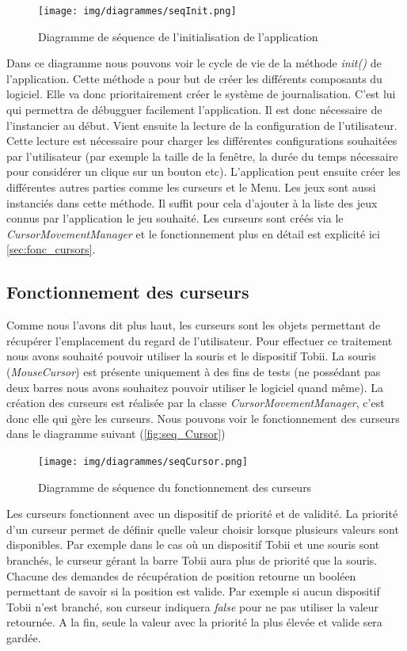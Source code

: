 \documentclass{polytech/polytech}
\begin{document}
\begin{figure}
    \centering
    \texttt{[image: img/diagrammes/seqInit.png]}
    \caption{Diagramme de séquence de l'initialisation de l'application}
    \label{fig:seq_init}
\end{figure}

Dans ce diagramme nous pouvons voir le cycle de vie de la méthode \textit{init()} de l'application. Cette méthode a pour but de créer les différents composants du logiciel. Elle va donc prioritairement créer le système de journalisation. C'est lui qui permettra de débugguer facilement l'application. Il est donc nécessaire de l'instancier au début. Vient ensuite la lecture de la configuration de l'utilisateur. Cette lecture est nécessaire pour charger les différentes configurations souhaitées par l'utilisateur (par exemple la taille de la fenêtre, la durée du temps nécessaire pour considérer un clique sur un bouton etc).
L'application peut ensuite créer les différentes autres parties comme les curseurs et le Menu.
Les jeux sont aussi instanciés dans cette méthode. Il suffit pour cela d'ajouter à la liste des jeux connus par l'application le jeu souhaité. Les curseurs sont créés via le \textit{CursorMovementManager} et le fonctionnement plus en détail est explicité ici \autoref{sec:fonc_cursors}.

\subsection{Fonctionnement des curseurs}
\label{sec:fonc_cursors}
Comme nous l'avons dit plus haut, les curseurs sont les objets permettant de récupérer l'emplacement du regard de l'utilisateur. Pour effectuer ce traitement nous avons souhaité pouvoir utiliser la souris et le dispositif Tobii. La souris (\textit{MouseCursor}) est présente uniquement à des fins de tests (ne possédant pas deux barres nous avons souhaitez pouvoir utiliser le logiciel quand même). La création des curseurs est réalisée par la classe \textit{CursorMovementManager}, c'est donc elle qui gère les curseurs. 
Nous pouvons voir le fonctionnement des curseurs dans le diagramme suivant (\autoref{fig:seq_Cursor})
\pagebreak
\begin{figure}
    \centering
    \texttt{[image: img/diagrammes/seqCursor.png]}
    \caption{Diagramme de séquence du fonctionnement des curseurs}
    \label{fig:seq_Cursor}
\end{figure}
Les curseurs fonctionnent avec un dispositif de priorité et de validité. La priorité d'un curseur permet de définir quelle valeur choisir lorsque plusieurs valeurs sont disponibles. Par exemple dans le cas où un dispositif Tobii et une souris sont branchés, le curseur gérant la barre Tobii aura plus de priorité que la souris. Chacune des demandes de récupération de position retourne un booléen permettant de savoir si la position est valide. Par exemple si aucun dispositif Tobii n'est branché, son curseur indiquera \textit{false} pour ne pas utiliser la valeur retournée. A la fin, seule la valeur avec la priorité la plus élevée et valide sera gardée. 
\end{document}
